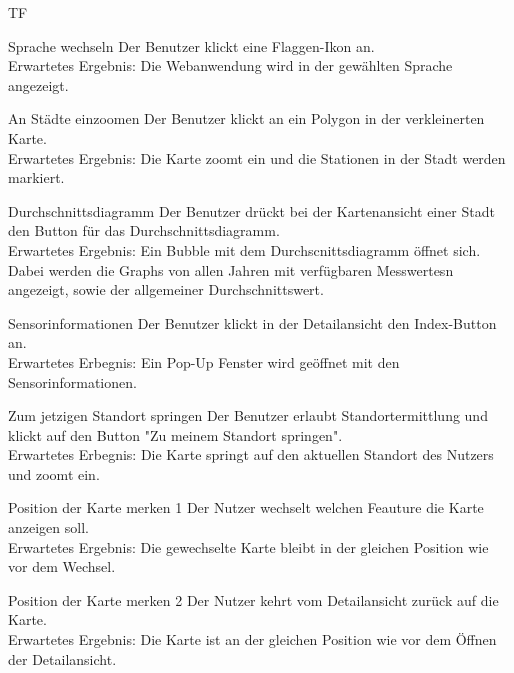 \begin{Kriterien}{TF}
	
	\item[Sprache wechseln] Der Benutzer klickt eine Flaggen-Ikon an. \\ Erwartetes Ergebnis: Die Webanwendung wird in der gewählten Sprache angezeigt.
	
	\item[An Städte einzoomen] Der Benutzer klickt an ein Polygon in der verkleinerten Karte. \\ Erwartetes Ergebnis: Die Karte zoomt ein und die \gls{Stationen} in der Stadt werden markiert.
	
	\item[Durchschnittsdiagramm] Der Benutzer drückt bei der Kartenansicht einer Stadt den Button für das Durchschnittsdiagramm. \\ Erwartetes Ergebnis: Ein Bubble mit dem Durchscnittsdiagramm öffnet sich. Dabei werden die \glspl{Graph} von allen Jahren mit verfügbaren \glspl{Messwerte}n angezeigt, sowie der allgemeiner Durchschnittswert.
	
	\item[Sensorinformationen] Der Benutzer klickt in der Detailansicht den Index-Button an. \\ Erwartetes Erbegnis: Ein Pop-Up Fenster
wird geöffnet mit den Sensorinformationen.

	\item[Zum jetzigen Standort springen] Der Benutzer erlaubt Standortermittlung und klickt auf den Button "Zu meinem Standort springen". \\ Erwartetes Erbegnis: Die Karte springt auf den aktuellen Standort des Nutzers und zoomt ein.
	
	\item[Position der Karte merken 1] Der Nutzer wechselt welchen Feauture die Karte anzeigen soll. \\ 
	Erwartetes Ergebnis: Die gewechselte Karte bleibt in der gleichen Position wie vor dem Wechsel.
	
	\item[Position der Karte merken 2] Der Nutzer kehrt vom Detailansicht zurück auf die Karte. \\ 
	Erwartetes Ergebnis: Die Karte ist an der gleichen Position wie vor dem Öffnen der Detailansicht.
	
\end{Kriterien}
